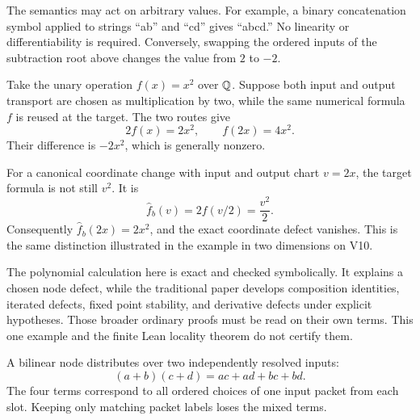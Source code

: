 The semantics may act on arbitrary values. For example, a binary concatenation symbol applied to strings ``ab'' and ``cd'' gives ``abcd.'' No linearity or differentiability is required. Conversely, swapping the ordered inputs of the subtraction root above changes the value from $2$ to $-2$.


Take the unary operation $f(x)=x^2$ over $\mathbb Q$. Suppose both input and output transport are chosen as multiplication by two, while the same numerical formula $f$ is reused at the target. The two routes give
\[
2f(x)=2x^2,\qquad f(2x)=4x^2.
\]
Their difference is $-2x^2$, which is generally nonzero.


For a canonical coordinate change with input and output chart $v=2x$, the target formula is not still $v^2$. It is
\[
\widehat f_b(v)=2f(v/2)=\frac{v^2}{2}.
\]
Consequently $\widehat f_b(2x)=2x^2$, and the exact coordinate defect vanishes. This is the same distinction illustrated in the example in two dimensions on V10.

The polynomial calculation here is exact and checked symbolically. It explains a chosen node defect, while the traditional paper develops composition identities, iterated defects, fixed point stability, and derivative defects under explicit hypotheses. Those broader ordinary proofs must be read on their own terms. This one example and the finite Lean locality theorem do not certify them.


A bilinear node distributes over two independently resolved inputs:
\[
(a+b)(c+d)=ac+ad+bc+bd.
\]
The four terms correspond to all ordered choices of one input packet from each slot. Keeping only matching packet labels loses the mixed terms.

